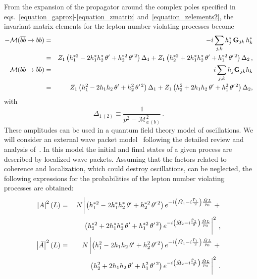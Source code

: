 \documentclass[11pt,a4paper]{article}
\providecommand{\proarrow}[0]{\rightarrow}
\providecommand{\proname}[2]{#1 \proarrow #2}
\providecommand{\abss}[1]{\left\lvert #1 \right\rvert^2}
\providecommand{\cpm}[0]{\mathcal{M}}
\providecommand{\pmed}[0]{p_0}
\providecommand{\mmed}[0]{\tilde{M}}
\providecommand{\pra}[0]{\tilde{M}_1}
\providecommand{\prb}[0]{\tilde{M}_2}
\providecommand{\pia}[0]{\tilde{\Gamma}_1}
\providecommand{\pib}[0]{\tilde{\Gamma}_2}
\begin{document}
From the expansion of the propagator around the complex poles specified in eqs.~\eqref{equation_gaprox}-\eqref{equation_zmatrix} and~\eqref{equation_zelements2}, the invariant matrix elements for the lepton number violating processes become 
\begin{eqnarray*}
-\mathcal{M}(\proname{\bar b \bar b}{b b}) & = & - i \sum_{j,k} h_j^* \, {\bf G}_{j k} \, h_k^* \\ &=& Z_1 \left( h_1^{* 2} - 2 h_1^* h_2^* \, \theta' + h_2^{* 2}\, \theta'^{\,2} \right) \Delta_1 +   Z_1 \left( h_2^{* 2} + 2 h_1^* h_2^* \,\theta' + h_1^{* 2} \,\theta'^{\,2}\right) \Delta_2 \, , \\
-\mathcal{M}(\proname{b b}{\bar b \bar b}) & = & -i \sum_{j,k}  h_j {\bf G}_{j k}  h_k \\ &=& Z_1 \left( h_1^2 - 2 h_1 h_2 \,\theta' + h_2^2 \,\theta'^{\,2} \right) \Delta_1 +   Z_1 \left( h_2^2 + 2 h_1 h_2 \,\theta' + h_1^2 \,\theta'^{\,2}\right) \Delta_2  , 
\end{eqnarray*}
with
\begin{equation*}
\Delta_{1\,(2)} \equiv \frac{1}{p^2 - \cpm_{a \, (b)}^2} \, .
\end{equation*}
These amplitudes can be used in a quantum field theory model of oscillations. We will consider an external wave packet model~\cite{1963AnPhy22, PhysRevD.48.4310} following the detailed review and analysis of~\cite{Beuthe01}. In this model the initial and final states of a given process are described by localized wave packets. Assuming that the factors related to coherence and localization, which could destroy oscillations, can be neglected, the following expressions for the probabilities of the lepton number violating processes are obtained:
\begin{eqnarray}
\label{equation_AL}
\abss{A}(L)  &=&  N \left|\left( h_1^{* 2} - 2 h_1^* h_2^* \,\theta' + h_2^{* 2} \,\theta'^{\,2}\right)  e^{-i \left(\pra - i \frac{\pia}{2}\right) \frac{\mmed L}{\pmed}} \; + \notag \right.\\ & & \quad \; \left. \left( h_2^{* 2} + 2 h_1^* h_2^* \,\theta' + h_1^{* 2} \,\theta'^{\,2} \right)    e^{-i \left(\prb - i \frac{\pib}{2}\right) \frac{\mmed L}{\pmed}}  \right|^2 \, , \notag \\
\abss{\bar A}(L)  &=&  N \left|  \left( h_1^2 - 2 h_1 h_2 \,\theta' + h_2^2\, \theta'^{\,2} \right) e^{-i \left(\pra - i \frac{\pia}{2}\right) \frac{\mmed L}{\pmed}} \; + \notag \right.\\ & & \quad \; \left.   \left( h_2^2 + 2 h_1 h_2 \,\theta' + h_1^2\, \theta'^{\,2} \right) e^{-i \left(\prb - i \frac{\pib}{2}\right) \frac{\mmed L}{\pmed}}  \right|^2 \, .
\end{eqnarray}
\end{document}
